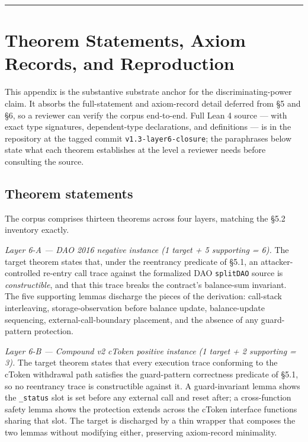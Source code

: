 \begin{center}\rule{0.5\linewidth}{0.5pt}\end{center}

\appendices

\section{Theorem Statements, Axiom Records, and
Reproduction}\label{theorem-statements-axiom-records-and-reproduction}

This appendix is the substantive substrate anchor for the
discriminating-power claim. It absorbs the full-statement and
axiom-record detail deferred from §5 and §6, so a reviewer can verify
the corpus end-to-end. Full Lean 4 source --- with exact type
signatures, dependent-type declarations, and definitions --- is in the
repository at the tagged commit \texttt{v1.3-layer6-closure}; the
paraphrases below state what each theorem establishes at the level a
reviewer needs before consulting the source.

\subsection{Theorem statements}\label{theorem-statements}

The corpus comprises thirteen theorems across four layers, matching the
§5.2 inventory exactly.

\emph{Layer 6-A --- DAO 2016 negative instance (1 target + 5 supporting
= 6).} The target theorem states that, under the reentrancy predicate of
§5.1, an attacker-controlled re-entry call trace against the formalized
DAO \texttt{splitDAO} source is \emph{constructible}, and that this
trace breaks the contract's balance-sum invariant. The five supporting
lemmas discharge the pieces of the derivation: call-stack interleaving,
storage-observation before balance update, balance-update sequencing,
external-call-boundary placement, and the absence of any guard-pattern
protection.

\emph{Layer 6-B --- Compound v2 cToken positive instance (1 target + 2
supporting = 3).} The target theorem states that every execution trace
conforming to the cToken withdrawal path satisfies the guard-pattern
correctness predicate of §5.1, so no reentrancy trace is constructible
against it. A guard-invariant lemma shows the \texttt{\_status} slot is
set before any external call and reset after; a cross-function safety
lemma shows the protection extends across the cToken interface functions
sharing that slot. The target is discharged by a thin wrapper that
composes the two lemmas without modifying either, preserving
axiom-record minimality.

